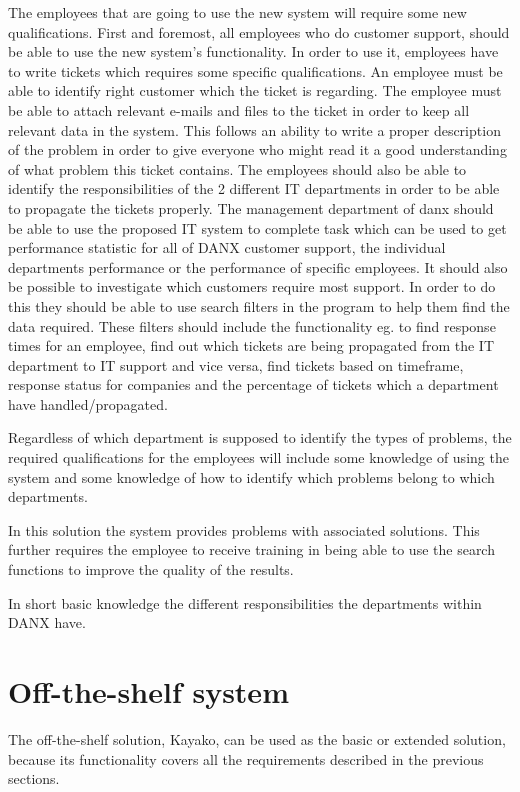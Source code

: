The employees that are going to use the new system will require some new qualifications. First and foremost, all employees who do customer support, should be able to use the new system's functionality. In order to use it, employees have to write tickets which requires some specific qualifications. An employee must be able to identify right customer which the ticket is regarding. The employee must be able to attach relevant e-mails and files to the ticket in order to keep all relevant data in the system. This follows an ability to write a proper description of the problem in order to give everyone who might read it a good understanding of what problem this ticket contains. The employees should also be able to identify the responsibilities of the 2 different IT departments in order to be able to propagate the tickets properly.
The management department of danx should be able to use the proposed IT system to complete task which can be used to get performance statistic for all of DANX customer support, the individual departments performance or the performance of specific employees. It should also be possible to investigate which customers require most support.
In order to do this they should be able to use search filters in the program to help them find the data required. These filters should include the functionality eg. to find response times for an employee, find out which tickets are being propagated from the IT department to IT support and vice versa, find tickets based on timeframe, response status for companies and the percentage of tickets which a department have handled/propagated.

Regardless of which department is supposed to identify the types of problems, the required qualifications for the employees will include some knowledge of using the system and some knowledge of how to identify which problems belong to which departments.

In this solution the system provides problems with associated solutions.
This further requires the employee to receive training in being able to use the search functions to improve the quality of the results.

In short basic knowledge the different responsibilities the departments within DANX have.

\section{Off-the-shelf system}
The off-the-shelf solution, Kayako\cite{webpage005}, can be used as the basic or extended solution, because its functionality covers all the requirements described in the previous sections.\\	

